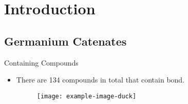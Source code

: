 \documentclass[compress]{beamer}
\begin{document}
\section{Introduction}
\subsection{Germanium Catenates}
\begin{frame}[t]{ Containing Compounds} \vspace{20pt}

\begin{itemize}

\item There are 134 compounds in total that contain  bond.

\begin{figure}
\texttt{[image: example-image-duck]}
\end{figure}


\end{itemize}


\end{frame}
\end{document}
